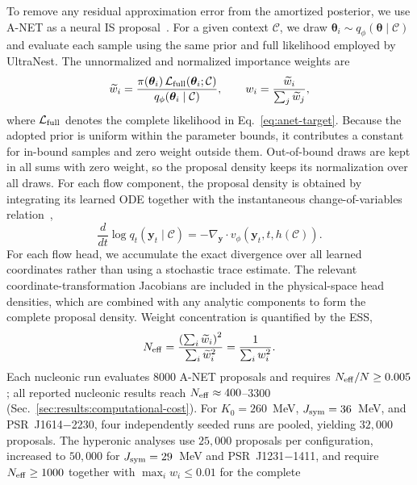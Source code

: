 \documentclass[aps,prd,twocolumn,superscriptaddress,nofootinbib,longbibliography]{revtex4-2}
\begin{document}
To remove any residual approximation error from the amortized posterior, we use
A-NET as a neural IS proposal~\cite{Dax:2022pxd}. For a given
context $\mathcal C$, we draw
$\bm\theta_i\sim q_\phi(\bm\theta\mid\mathcal C)$ and evaluate each sample using
the same prior and full likelihood employed by UltraNest. The unnormalized and
normalized importance weights are
\begin{equation}
\widetilde w_i=
\frac{\pi(\bm\theta_i)\,
\mathcal L_{\rm full}(\bm\theta_i;\mathcal C)}
{q_\phi(\bm\theta_i\mid\mathcal C)},
\qquad
w_i=\frac{\widetilde w_i}{\sum_j\widetilde w_j},
\label{eq:anet-is-weights}
\end{equation}
where $\mathcal L_{\rm full}$ denotes the complete likelihood in
Eq.~\eqref{eq:anet-target}. Because the adopted prior is uniform within the
parameter bounds, it contributes a constant for in-bound samples and zero
weight outside them. Out-of-bound draws are kept in all sums with zero weight,
so the proposal density keeps its normalization over all draws. For each flow component, the
proposal density is obtained by integrating its learned ODE together with the
instantaneous change-of-variables relation~\cite{Chen:2018wjc},
\begin{equation}
\frac{d}{dt}\log q_t(\bm y_t\mid\mathcal C)
=-\nabla_{\bm y}\!\cdot
v_\phi(\bm y_t,t,h(\mathcal C)).
\label{eq:anet-log-density}
\end{equation}
For each flow head, we accumulate the exact divergence
over all learned coordinates rather than using a stochastic trace estimate.
The relevant coordinate-transformation Jacobians are included in the
physical-space head densities, which are combined with any analytic components
to form the complete proposal density. Weight concentration is quantified by the
ESS,
\begin{equation}
N_{\rm eff}
=\frac{\left(\sum_i\widetilde w_i\right)^2}
{\sum_i\widetilde w_i^2}
=\frac{1}{\sum_i w_i^2}.
\label{eq:anet-ess}
\end{equation}
Each nucleonic run evaluates $8000$ A-NET proposals
and requires $N_{\rm eff}/N\geq0.005$; all reported nucleonic results reach
$N_{\rm eff}\approx400$--$3300$ (Sec.~\ref{sec:results:computational-cost}). For $K_0=260$~MeV,
$J_{\rm sym}=36$~MeV, and PSR~J1614$-$2230, four independently seeded runs are
pooled, yielding $32{,}000$ proposals. The hyperonic analyses use $25{,}000$
proposals per configuration, increased to $50{,}000$ for
$J_{\rm sym}=29$~MeV and PSR~J1231$-$1411, and require
$N_{\rm eff}\geq1000$ together with $\max_i w_i\leq0.01$ for the complete
\end{document}
